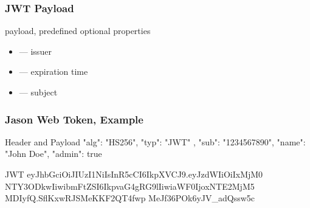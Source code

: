 \begin{frame}[fragile] \frametitle{JWT Payload}
payload, predefined optional properties
\begin{itemize}
  \item {} --- issuer
  \item {} --- expiration time
  \item {} --- subject
\end{itemize}
\end{frame}

\begin{frame}[fragile] \frametitle{Jason Web Token, Example}
\begin{CodeBox}{Header and Payload}
{
  "alg": "HS256",
   "typ": "JWT"
}, {
  "sub": "1234567890",
  "name": "John Doe",
  "admin": true
}
\end{CodeBox}

\begin{CodeBox}{JWT}
eyJhbGciOiJIUzI1NiIsInR5cCI6IkpXVCJ9.eyJzdWIiOiIxMjM0
NTY3ODkwIiwibmFtZSI6IkpvaG4gRG9lIiwiaWF0IjoxNTE2MjM5
MDIyfQ.SflKxwRJSMeKKF2QT4fwp MeJf36POk6yJV_adQssw5c
\end{CodeBox}
\end{frame}



